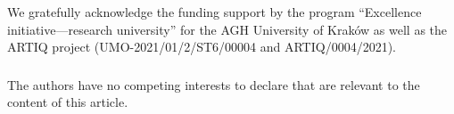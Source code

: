 \documentclass[runningheads]{llncs}
\begin{document}
\vspace*{-0.3cm}
\begin{credits}

	\subsubsection{\ackname} We gratefully acknowledge the funding support by the program ``Excellence initiative—research
	university'' for the AGH University of Kraków as well as the ARTIQ project (UMO-2021/01/2/ST6/00004 and
	ARTIQ/0004/2021).

	\vspace*{-0.3cm}
	\subsubsection{\discintname}
	The authors have no competing interests to declare that are
	relevant to the content of this article.

\end{credits}


\setlength{\emergencystretch}{5em}


\end{document}

